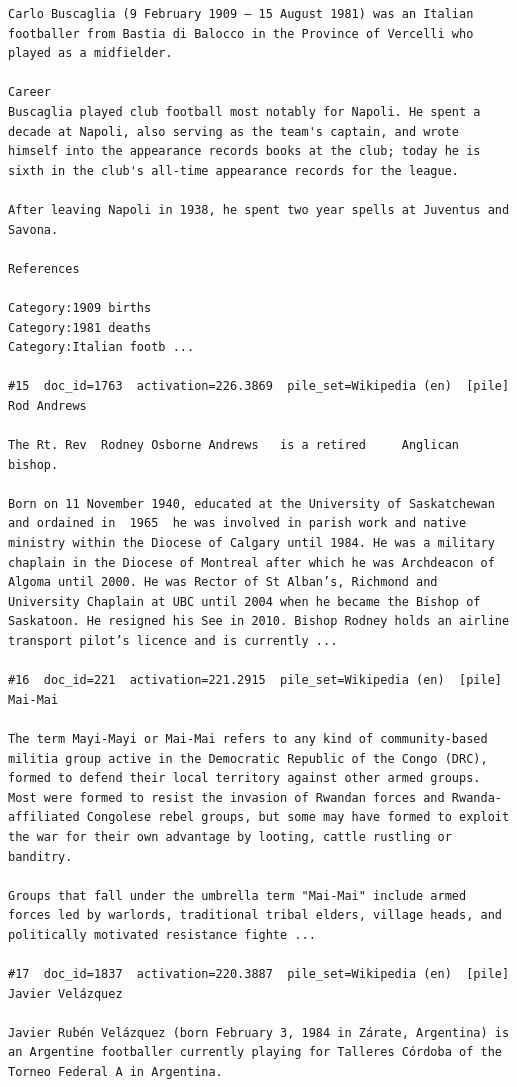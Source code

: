 \begin{verbatim}
Carlo Buscaglia (9 February 1909 – 15 August 1981) was an Italian footballer from Bastia di Balocco in the Province of Vercelli who played as a midfielder.

Career
Buscaglia played club football most notably for Napoli. He spent a decade at Napoli, also serving as the team's captain, and wrote himself into the appearance records books at the club; today he is sixth in the club's all-time appearance records for the league.

After leaving Napoli in 1938, he spent two year spells at Juventus and Savona.

References

Category:1909 births
Category:1981 deaths
Category:Italian footb ...

#15  doc_id=1763  activation=226.3869  pile_set=Wikipedia (en)  [pile]
Rod Andrews

The Rt. Rev  Rodney Osborne Andrews   is a retired     Anglican bishop.

Born on 11 November 1940, educated at the University of Saskatchewan and ordained in  1965  he was involved in parish work and native ministry within the Diocese of Calgary until 1984. He was a military chaplain in the Diocese of Montreal after which he was Archdeacon of Algoma until 2000. He was Rector of St Alban’s, Richmond and University Chaplain at UBC until 2004 when he became the Bishop of Saskatoon. He resigned his See in 2010. Bishop Rodney holds an airline transport pilot’s licence and is currently ...

#16  doc_id=221  activation=221.2915  pile_set=Wikipedia (en)  [pile]
Mai-Mai

The term Mayi-Mayi or Mai-Mai refers to any kind of community-based militia group active in the Democratic Republic of the Congo (DRC), formed to defend their local territory against other armed groups. Most were formed to resist the invasion of Rwandan forces and Rwanda-affiliated Congolese rebel groups, but some may have formed to exploit the war for their own advantage by looting, cattle rustling or banditry.

Groups that fall under the umbrella term "Mai-Mai" include armed forces led by warlords, traditional tribal elders, village heads, and politically motivated resistance fighte ...

#17  doc_id=1837  activation=220.3887  pile_set=Wikipedia (en)  [pile]
Javier Velázquez

Javier Rubén Velázquez (born February 3, 1984 in Zárate, Argentina) is an Argentine footballer currently playing for Talleres Córdoba of the Torneo Federal A in Argentina.


\end{verbatim}

